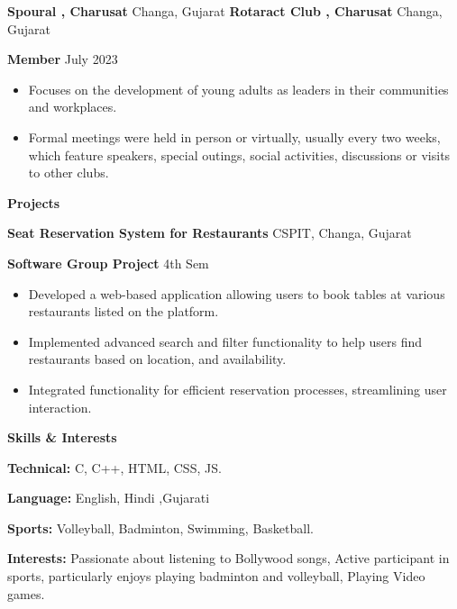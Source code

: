\documentclass[11pt]{article}
\begin{document}
\textbf{Spoural , Charusat}	\hfill Changa, Gujarat
\newline
\textbf{Rotaract Club , Charusat}	\hfill Changa, Gujarat

\textbf{Member} \hfill July 2023
\begin{itemize}[noitemsep, topsep=0pt, partopsep=0pt, parsep=0pt]
   \item Focuses on the development of young adults as leaders in their communities and workplaces.
   \item Formal meetings were held in person or virtually, usually every two weeks, which feature speakers, special outings, social activities, discussions or visits to other clubs.

\end{itemize}


\vspace{12pt}



\begin{center}
    \textbf{Projects }
\end{center}



\vspace{12pt}

\textbf{Seat Reservation System for Restaurants}	\hfill CSPIT, Changa, Gujarat

\textbf{Software Group Project} \hfill 4th Sem
\begin{itemize}[noitemsep, topsep=0pt, partopsep=0pt, parsep=0pt]
    \item Developed a web-based application allowing users to book tables at various restaurants listed on the platform.
    \item Implemented advanced search and filter functionality to help users find restaurants based on location, and availability.
    \item Integrated functionality for efficient reservation processes, streamlining user interaction.

\end{itemize}

\vspace{12pt}

\begin{center}
    \textbf{Skills \& Interests }
\end{center}

\textbf{Technical:} C, C++, HTML, CSS, JS.

\textbf{Language:} English, Hindi ,Gujarati 

\textbf{Sports:} Volleyball, Badminton, Swimming, Basketball.

\textbf{Interests:} Passionate about listening to Bollywood songs, Active participant in sports, particularly enjoys playing badminton and volleyball, Playing Video games.
\end{document}
